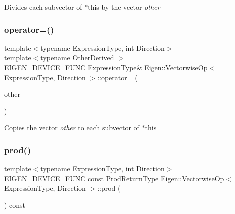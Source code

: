Divides each subvector of {\ttfamily $\ast$this} by the vector {\itshape other} \mbox{\label{class_eigen_1_1_vectorwise_op_a61f54a2994758cc098671d5f0f36cfa6}} 
\subsubsection{\texorpdfstring{operator=()}{operator=()}}
{\footnotesize\ttfamily template$<$typename Expression\+Type, int Direction$>$ \\
template$<$typename Other\+Derived $>$ \\
E\+I\+G\+E\+N\+\_\+\+D\+E\+V\+I\+C\+E\+\_\+\+F\+U\+NC Expression\+Type\& \mbox{\hyperlink{class_eigen_1_1_vectorwise_op}{Eigen\+::\+Vectorwise\+Op}}$<$ Expression\+Type, Direction $>$\+::operator= (\begin{DoxyParamCaption}\item[{const \mbox{\hyperlink{class_eigen_1_1_dense_base}{Dense\+Base}}$<$ Other\+Derived $>$ \&}]{other }\end{DoxyParamCaption})\hspace{0.3cm}{\ttfamily [inline]}}

Copies the vector {\itshape other} to each subvector of {\ttfamily $\ast$this} \mbox{\label{class_eigen_1_1_vectorwise_op_a6863499c3e7ea8635784376806abcf9f}} 
\subsubsection{\texorpdfstring{prod()}{prod()}}
{\footnotesize\ttfamily template$<$typename Expression\+Type, int Direction$>$ \\
E\+I\+G\+E\+N\+\_\+\+D\+E\+V\+I\+C\+E\+\_\+\+F\+U\+NC const \mbox{\hyperlink{class_eigen_1_1_partial_redux_expr}{Prod\+Return\+Type}} \mbox{\hyperlink{class_eigen_1_1_vectorwise_op}{Eigen\+::\+Vectorwise\+Op}}$<$ Expression\+Type, Direction $>$\+::prod (\begin{DoxyParamCaption}{ }\end{DoxyParamCaption}) const\hspace{0.3cm}{\ttfamily [inline]}}

